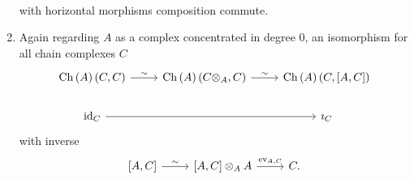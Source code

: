 \documentclass[dissertation.tex]{subfiles}
\begin{document}
\begin{rmk}
\begin{enumerate}
$$\begin{tikzcd}
    \end{tikzcd}$$
    with horizontal morphisms composition commute.
  \item
    Again regarding $A$ as a complex concentrated in degree 0, an isomorphism for all chain complexes $C$
    $$\begin{tikzcd}
      \Ch{A}\left(C,C\right) \arrow{r}{\sim} & 
      \Ch{A}\left(C \otimes_A,C\right) \arrow{r}{\sim}&
      \Ch{A}\left(C,\left[A,C\right]\right)\\
      \id_C \arrow{rr} & & \imath_C
    \end{tikzcd}$$
    with inverse
    $$\begin{tikzcd}
      \left[A,C\right] \arrow{r}{\sim} & \left[A,C\right] \otimes_A A \arrow{r}{\operatorname{ev}_{A,C}} & C.
    \end{tikzcd}$$
  \end{enumerate}
\end{rmk}
\end{document}
